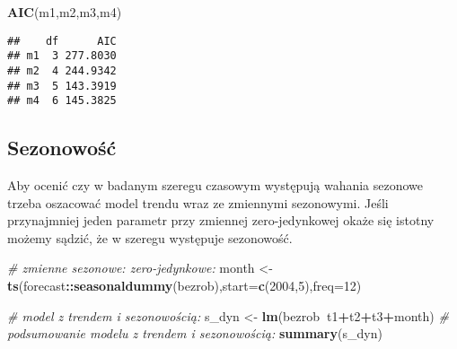 \documentclass[polish,]{book}
\newenvironment{Shaded}{\begin{snugshade}}{\end{snugshade}}
\newcommand{\CommentTok}[1]{\textcolor[rgb]{0.56,0.35,0.01}{\textit{#1}}}
\newcommand{\DataTypeTok}[1]{\textcolor[rgb]{0.13,0.29,0.53}{#1}}
\newcommand{\DecValTok}[1]{\textcolor[rgb]{0.00,0.00,0.81}{#1}}
\newcommand{\KeywordTok}[1]{\textcolor[rgb]{0.13,0.29,0.53}{\textbf{#1}}}
\newcommand{\NormalTok}[1]{#1}
\newcommand{\OperatorTok}[1]{\textcolor[rgb]{0.81,0.36,0.00}{\textbf{#1}}}
\newcommand{\StringTok}[1]{\textcolor[rgb]{0.31,0.60,0.02}{#1}}
\begin{document}
\begin{Shaded}
\begin{Highlighting}[]
\KeywordTok{AIC}\NormalTok{(m1,m2,m3,m4)}
\end{Highlighting}
\end{Shaded}

\begin{verbatim}
##    df      AIC
## m1  3 277.8030
## m2  4 244.9342
## m3  5 143.3919
## m4  6 145.3825
\end{verbatim}

\hypertarget{part_10.2.2}{%
\subsection{Sezonowość}\label{part_10.2.2}}

Aby ocenić czy w badanym szeregu czasowym występują wahania sezonowe trzeba
oszacować model trendu wraz ze zmiennymi sezonowymi. Jeśli przynajmniej jeden
parametr przy zmiennej zero-jedynkowej okaże się istotny możemy sądzić, że w szeregu występuje sezonowość.

\begin{Shaded}
\begin{Highlighting}[]
\CommentTok{# zmienne sezonowe: zero-jedynkowe:}
\NormalTok{month <-}\StringTok{ }\KeywordTok{ts}\NormalTok{(forecast}\OperatorTok{::}\KeywordTok{seasonaldummy}\NormalTok{(bezrob),}\DataTypeTok{start=}\KeywordTok{c}\NormalTok{(}\DecValTok{2004}\NormalTok{,}\DecValTok{5}\NormalTok{),}\DataTypeTok{freq=}\DecValTok{12}\NormalTok{)}
\end{Highlighting}
\end{Shaded}

\begin{Shaded}
\begin{Highlighting}[]
\CommentTok{# model z trendem i sezonowością:}
\NormalTok{s_dyn <-}\StringTok{ }\KeywordTok{lm}\NormalTok{(bezrob}\OperatorTok{~}\NormalTok{t1}\OperatorTok{+}\NormalTok{t2}\OperatorTok{+}\NormalTok{t3}\OperatorTok{+}\NormalTok{month)}
\CommentTok{# podsumowanie modelu z trendem i sezonowością:}
\KeywordTok{summary}\NormalTok{(s_dyn)}
\end{Highlighting}
\end{Shaded}
\end{document}
